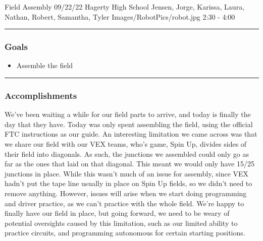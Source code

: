 \insertmeeting 
	{Field Assembly} 
	{09/22/22}
	{Hagerty High School}
	{Jensen, Jorge, Karissa, Laura, Nathan, Robert, Samantha, Tyler}
	{Images/RobotPics/robot.jpg}
	{2:30 - 4:00}

\noindent\hfil\rule{\textwidth}{.4pt}\hfil
\subsubsection*{Goals}
\begin{itemize}
    \item Assemble the field
\end{itemize} 

\noindent\hfil\rule{\textwidth}{.4pt}\hfil

\subsubsection*{Accomplishments}
We've been waiting a while for our field parts to arrive, and today is finally the day that they have. Today was only spent assembling the field, using the official FTC instructions as our guide. An interesting limitation we came across was that we share our field with our VEX teams, who's game, Spin Up, divides sides of their field into diagonals. As such, the junctions we assembled could only go as far as the ones that laid on that diagonal. This meant we would only have 15/25 junctions in place. While this wasn't much of an issue for assembly, since VEX hadn't put the tape line usually in place on Spin Up fields, so we didn't need to remove anything. However, issues will arise when we start doing programming and driver practice, as we can't practice with the whole field. We're happy to finally have our field in place, but going forward, we need to be weary of potential oversights caused by this limitation, such as our limited ability to practice circuits, and programming autonomous for certain starting positions.


